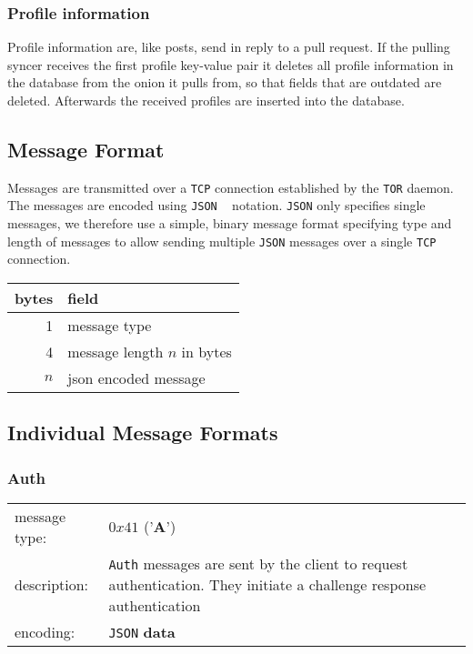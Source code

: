 \documentclass[12pt]{article}
\begin{document}
\subsubsection{Profile information}
Profile information are, like posts, send in reply to a pull request. If the pulling syncer receives the first profile key-value pair it
deletes all profile information in the database from the onion it pulls from, so that fields that are outdated are deleted.
Afterwards the received profiles are inserted into the database.
\subsection{Message Format}

Messages are transmitted over a \texttt{TCP} connection established by the \texttt{TOR} daemon. The messages are encoded using \texttt{JSON} ~\cite{rfc7159} notation. \texttt{JSON} only specifies single messages, we therefore use a simple, binary message format specifying type and length of messages to allow sending multiple \texttt{JSON} messages over a single \texttt{TCP} connection.

\begin{tabular}{|r|l|}
\hline
bytes & field \\\hline\hline
1 & message type \\\hline
4 & message length $n$ in bytes\\\hline
$n$ & json encoded message \\\hline
\end{tabular}

\subsection{Individual Message Formats}

\label{messages}

\subsubsection*{Auth}

\begin{tabular}{l p{}}
\hline
message type: & $0x41$ ('\textbf{A}') \\
description: & \texttt{Auth} messages are sent by the client to request authentication. They initiate a challenge response authentication \\
encoding: & \texttt{JSON} \textbf{data} \\\hline
\end{tabular}
\end{document}

